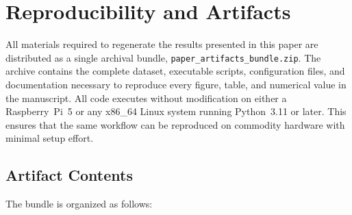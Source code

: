 \documentclass[acmsmall]{acmart}
\begin{document}
\section{Reproducibility and Artifacts}

All materials required to regenerate the results presented in this paper are distributed as a single archival bundle, \texttt{paper\_artifacts\_bundle.zip}.  
The archive contains the complete dataset, executable scripts, configuration files, and documentation necessary to reproduce every figure, table, and numerical value in the manuscript.  
All code executes without modification on either a Raspberry~Pi~5 or any x86\_64 Linux system running Python~3.11 or later.  
This ensures that the same workflow can be reproduced on commodity hardware with minimal setup effort.

\subsection{Artifact Contents}

The bundle is organized as follows:
\end{document}
